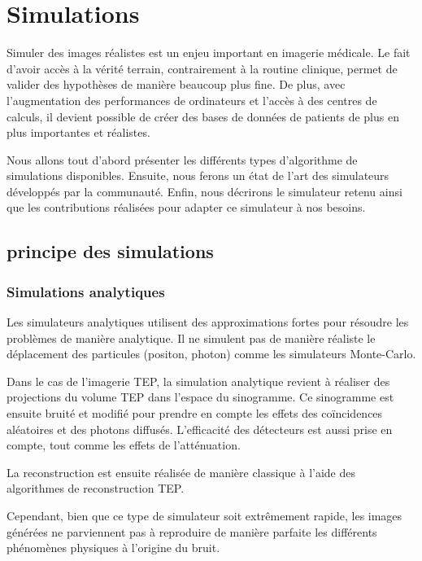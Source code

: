 \chapter{Simulations}

Simuler des images réalistes est un enjeu important en imagerie médicale. Le fait d'avoir accès à la vérité terrain, contrairement à la routine clinique, permet de valider des hypothèses de manière beaucoup plus fine. De plus, avec l'augmentation des performances de ordinateurs et l'accès à des centres de calculs, il devient possible de créer des bases de données de patients de plus en plus importantes et réalistes.

Nous allons tout d'abord présenter les différents types d'algorithme de simulations disponibles. Ensuite, nous ferons un état de l'art des simulateurs développés par la communauté. Enfin, nous décrirons le simulateur retenu ainsi que les contributions réalisées pour adapter ce simulateur à nos besoins.

	\section{principe des simulations}

		\subsection{Simulations analytiques}

Les simulateurs analytiques utilisent des approximations fortes pour résoudre les problèmes de manière analytique. Il ne simulent pas de manière réaliste le déplacement des particules (positon, photon) comme les simulateurs Monte-Carlo.

Dans le cas de l'imagerie TEP, la simulation analytique revient à réaliser des projections du volume TEP dans l'espace du sinogramme. Ce sinogramme est ensuite bruité et modifié pour prendre en compte les effets des coïncidences aléatoires et des photons diffusés. L'efficacité des détecteurs est aussi prise en compte, tout comme les effets de l'atténuation. 

La reconstruction est ensuite réalisée de manière classique à l'aide des algorithmes de reconstruction TEP.


Cependant, bien que ce type de simulateur soit extrêmement rapide, les images générées ne parviennent pas à reproduire de manière parfaite les différents phénomènes physiques à l'origine du bruit.




